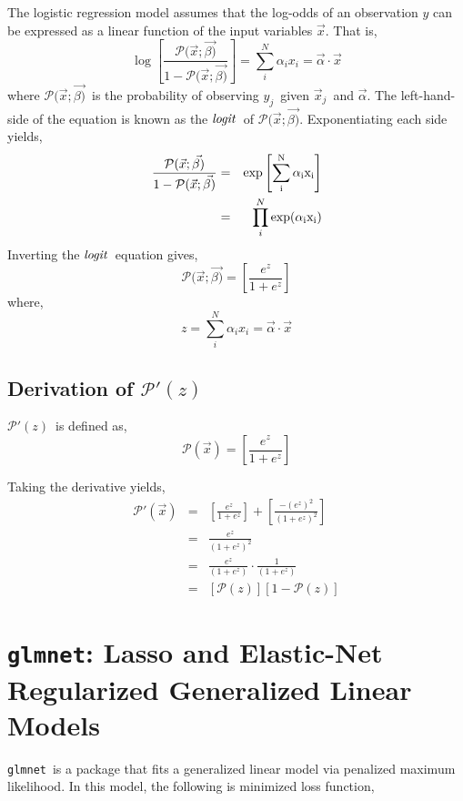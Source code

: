 \documentclass[11pt, oneside]{article}   	%
\newcommand{\vx}{\vec{x}}
\newcommand{\vxj}{\vec{x}_{j}}
\newcommand{\yj}{y_{j}}
\newcommand{\va}{\vec{\alpha}}
\newcommand{\px}{\mathcal{P}(\vec{x};\vec{\beta)}}
\newcommand{\glmnet} {\tt glmnet}
\begin{document}
The logistic regression model assumes that the log-odds of an observation $y$ can be expressed as a linear function of the input variables $\vx$. That is,
\begin{equation}
\log \left[ \frac{\px}{1-\px} \right] = \sum_{i}^{N} \alpha_{i}x_{i} = \va \cdot \vx
\end{equation}
where $\px$~is the probability of observing $\yj$~given $\vxj$~and $\va$. The left-hand-side of the equation is known as the $\it{logit}$~of $\px$. Exponentiating each side yields,
\begin{eqnarray}
	\frac{\px}{1-\px}	&=& \rm{exp} \left[ {\sum_{i}^{N} \alpha_{i}x_{i}} \right] \\
				&=& \prod_{i}^{N} \rm{exp}(\alpha_{i}x_{i})
\end{eqnarray}
Inverting the $\it{logit}$~equation gives,
\begin{equation}
\px = \left[ \frac{e^{z}}{1 + e^{z}} \right]
\end{equation}
where,
\begin{equation}
z = \sum_{i}^{N} \alpha_{i}x_{i} = \vec{\alpha}\cdot\vec{x}
\end{equation}


\subsection{Derivation of $\mathcal{P}'(z)$}
 $\mathcal{P}'(z)$~is defined as,
\begin{equation}
\mathcal{P}(\vec{x}) = \left[ \frac{e^{z}}{1 + e^{z}} \right]
\end{equation}

Taking the derivative yields,
\begin{eqnarray}
\mathcal{P}'(\vec{x})	&=& \left[ \frac{e^{z}}{1 + e^{z}} \right] +  \left[ \frac{-(e^{z})^{2}}{(1 + e^{z})^{2}} \right] \\
				&=& \frac{e^{z}}{(1 + e^{z})^{2}} \\
				&=& \frac{e^{z}}{(1 + e^{z})} \cdot \frac{1}{(1 + e^{z})} \\
				&=& [\mathcal{P}(z)][1-\mathcal{P}(z)]
\end{eqnarray}


\section{{\glmnet}: Lasso and Elastic-Net Regularized Generalized Linear Models}

{\glmnet}~is a package that fits a generalized linear model via penalized maximum likelihood. In this model, the following is minimized loss function,
\end{document}
